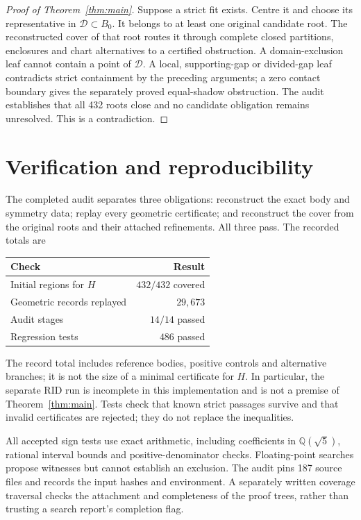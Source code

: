 \documentclass[11pt,a4paper]{article}
\newcommand{\Q}{\mathbb Q}
\newcommand{\HH}{H}
\begin{document}
\begin{proof}[Proof of Theorem~\ref{thm:main}]
Suppose a strict fit exists. Centre it and choose its representative in
$\mathcal D\subset B_0$. It belongs to at least one original candidate root.
The reconstructed cover of that root routes it through complete closed
partitions, enclosures and chart alternatives to a certified obstruction.
A domain-exclusion leaf cannot contain a point of $\mathcal D$.
A local, supporting-gap or divided-gap leaf contradicts strict containment
by the preceding arguments; a zero contact boundary gives the separately
proved equal-shadow obstruction. The audit establishes that all 432 roots
close and no candidate obligation remains unresolved. This is a contradiction.
\end{proof}

\section{Verification and reproducibility}\label{sec:verification}
The completed audit separates three obligations: reconstruct the exact body
and symmetry data; replay every geometric certificate; and reconstruct the
cover from the original roots and their attached refinements. All three pass.
The recorded totals are
\begin{center}
\begin{tabular}{lr}
\toprule
Check & Result\\\midrule
Initial regions for $\HH$ & $432/432$ covered\\
Geometric records replayed & $29{,}673$\\
Audit stages & $14/14$ passed\\
Regression tests & $486$ passed\\\bottomrule
\end{tabular}
\end{center}
The record total includes reference bodies, positive controls and alternative
branches; it is not the size of a minimal certificate for $\HH$. In particular,
the separate RID run is incomplete in this implementation and is not a premise
of Theorem~\ref{thm:main}. Tests check that known strict passages survive and
that invalid certificates are rejected; they do not replace the inequalities.

All accepted sign tests use exact arithmetic, including coefficients in
$\Q(\sqrt5)$, rational interval bounds and positive-denominator checks.
Floating-point searches propose witnesses but cannot establish an exclusion.
The audit pins 187 source files and records the input hashes and environment.
A separately written coverage traversal checks the attachment and completeness
of the proof trees, rather than trusting a search report's completion flag.
\end{document}

